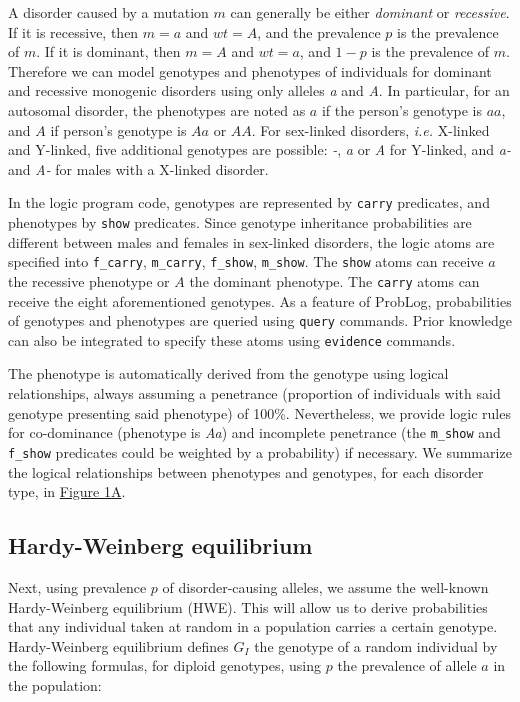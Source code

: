 \documentclass{eptcs}
\begin{document}
A disorder caused by a mutation $m$ can generally be either \textit{dominant} or \textit{recessive}. If it is recessive, then $m = a$ and $wt = A$, and the prevalence $p$ is the prevalence of $m$. If it is dominant, then $m = A$ and $wt = a$, and $1 - p$ is the prevalence of $m$. Therefore we can model genotypes and phenotypes of individuals for dominant and recessive monogenic disorders using only alleles \textit{a} and \textit{A}. In particular, for an autosomal disorder, the phenotypes are noted as $a$ if the person's genotype is $aa$, and $A$ if person's genotype is $Aa$ or $AA$. For sex-linked disorders, \textit{i.e.} X-linked and Y-linked, five additional genotypes are possible: \textit{-}, \textit{a} or \textit{A} for Y-linked, and \textit{a-} and \textit{A-} for males with a X-linked disorder.

In the logic program code, genotypes are represented by \texttt{carry} predicates, and phenotypes by \texttt{show} predicates. Since genotype inheritance probabilities are different between males and females in sex-linked disorders, the logic atoms are specified into \texttt{f\_carry}, \texttt{m\_carry}, \texttt{f\_show}, \texttt{m\_show}. The \texttt{show} atoms can receive $a$ the recessive phenotype or $A$ the dominant phenotype. The \texttt{carry} atoms can receive the eight aforementioned genotypes. As a feature of ProbLog, probabilities of genotypes and phenotypes are queried using \texttt{query} commands. Prior knowledge can also be integrated to specify these atoms using \texttt{evidence} commands.

The phenotype is automatically derived from the genotype using logical relationships, always assuming a penetrance (proportion of individuals with said genotype presenting said phenotype) of 100\%. Nevertheless, we provide logic rules for co-dominance (phenotype is \textit{Aa}) and incomplete penetrance (the \texttt{m\_show} and \texttt{f\_show} predicates could be weighted by a probability) if necessary. We summarize the logical relationships between phenotypes and genotypes, for each disorder type, in \hyperref[fig:methods]{Figure 1A}. 

\subsection*{Hardy-Weinberg equilibrium}

Next, using prevalence $p$ of disorder-causing alleles, we assume the well-known Hardy-Weinberg equilibrium (HWE). This will allow us to derive probabilities that any individual taken at random in a population carries a certain genotype. Hardy-Weinberg equilibrium defines $G_I$ the genotype of a random individual by the following formulas, for diploid genotypes, using $p$ the prevalence of allele $a$ in the population:
\end{document}
